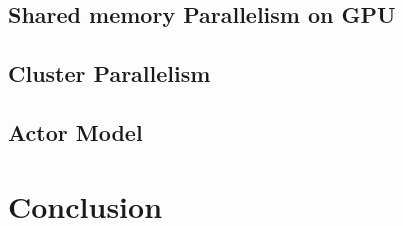 \documentclass[12pt]{article}
\begin{document}
	\subsection{Shared memory Parallelism on GPU}	\label{sec:openacc}			
	\subsection{Cluster Parallelism}			\label{sec:mpi}				
	\subsection{Actor Model}				\label{sec:actorModel}			
\newpage

\section{Conclusion}						\label{sec:conclusion}			
\newpage



\end{document}
